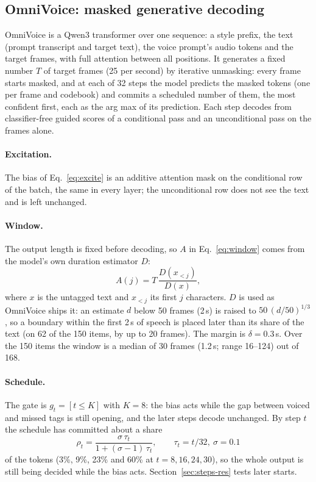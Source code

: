 \documentclass[11pt]{article}
\begin{document}
\subsection{OmniVoice: masked generative decoding}
\label{sec:impl-omni}
OmniVoice \citep{zhu2026omnivoice} is a Qwen3 transformer over one sequence: a style prefix, the text (prompt transcript and target text), the voice prompt's audio tokens and the target frames, with full attention between all positions. It generates a fixed number $T$ of target frames (25 per second) by iterative unmasking: every frame starts masked, and at each of 32 steps the model predicts the masked tokens (one per frame and codebook) and commits a scheduled number of them, the most confident first, each as the arg max of its prediction. Each step decodes from classifier-free guided scores \citep{ho2022cfg} of a conditional pass and an unconditional pass on the frames alone.

\paragraph{Excitation.} The bias of Eq.~\eqref{eq:excite} is an additive attention mask on the conditional row of the batch, the same in every layer; the unconditional row does not see the text and is left unchanged.

\paragraph{Window.} The output length is fixed before decoding, so $A$ in Eq.~\eqref{eq:window} comes from the model's own duration estimator $D$:
\begin{equation}
A(j) = T\,\frac{D(x_{<j})}{D(x)},
\label{eq:align}
\end{equation}
where $x$ is the untagged text and $x_{<j}$ its first $j$ characters. $D$ is used as OmniVoice ships it: an estimate $d$ below 50 frames (2\,s) is raised to $50\,(d/50)^{1/3}$, so a boundary within the first 2\,s of speech is placed later than its share of the text (on 62 of the 150 items, by up to 20 frames). The margin is $\delta = 0.3$\,s. Over the 150 items the window is a median of 30 frames (1.2\,s; range 16--124) out of 168.

\paragraph{Schedule.} The gate is $g_t = [t \le K]$ with $K = 8$: the bias acts while the gap between voiced and missed tags is still opening, and the later steps decode unchanged. By step $t$ the schedule has committed about a share
\begin{equation}
\rho_t = \frac{\sigma\,\tau_t}{1 + (\sigma - 1)\,\tau_t}, \qquad \tau_t = t/32,\ \sigma = 0.1
\label{eq:rho}
\end{equation}
of the tokens (3\%, 9\%, 23\% and 60\% at $t = 8, 16, 24, 30$), so the whole output is still being decided while the bias acts. Section~\ref{sec:steps-res} tests later starts.
\end{document}
